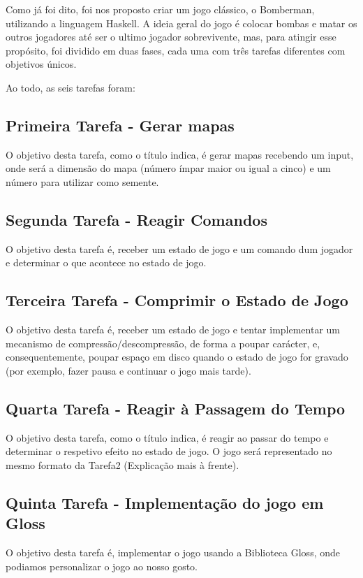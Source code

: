 \documentclass[a4paper]{article}
\begin{document}
Como já foi dito, foi nos proposto criar um jogo clássico, o Bomberman, utilizando
a linguagem Haskell. A ideia geral do jogo é colocar bombas e matar os outros jogadores
até ser o ultimo jogador sobrevivente, mas, para atingir esse propósito, foi dividido
em duas fases, cada uma com três tarefas diferentes com objetivos únicos.

Ao todo, as seis tarefas foram:

\subsection{Primeira Tarefa - Gerar mapas}
\label{subsec:tarefa1}
O objetivo desta tarefa, como o título indica, é gerar mapas recebendo um input, onde
será a dimensão do mapa (número ímpar maior ou igual a cinco) e um número para utilizar
como semente.

\subsection{Segunda Tarefa - Reagir Comandos}
\label{subsec:tarefa2}
O objetivo desta tarefa é, receber um estado de jogo e um comando dum jogador e determinar o que acontece no estado de jogo.

\subsection{Terceira Tarefa - Comprimir o Estado de Jogo}
\label{subsec:tarefa3}
O objetivo desta tarefa é, receber um estado de jogo e tentar implementar um mecanismo de compressão/descompressão, de forma a poupar carácter, e, consequentemente, poupar
espaço em disco quando o estado de jogo for gravado (por exemplo, fazer pausa e continuar o jogo mais tarde).

\subsection{Quarta Tarefa - Reagir à Passagem do Tempo}
\label{subsec:tarefa4}
O objetivo desta tarefa, como o título indica, é reagir ao passar do tempo e determinar o respetivo efeito
no estado de jogo. O jogo será representado no mesmo formato da Tarefa2 (Explicação mais à frente).

\subsection{Quinta Tarefa - Implementação do jogo em Gloss}
\label{subsec:tarefa5}
O objetivo desta tarefa é, implementar o jogo usando a Biblioteca Gloss, onde podiamos
personalizar o jogo ao nosso gosto.
\end{document}
